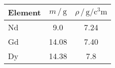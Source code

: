     \begin{table}
        \centering
        \caption{}
        \label{tab:}
        \begin{tabular}{l S[table-format=2.2] S[table-format=1.2]}
            \toprule
            Element & 
            $m\,/\,\si{\gram}$ & 
            $\rho\,/\,\si{\gram\per\cubic\centi\meter}$ \\
            \midrule
            Nd & \num{9.0}   & \num{7.24} \\
            Gd & \num{14.08} & \num{7.40} \\
            Dy & \num{14.38} & \num{7.8}  \\
            \bottomrule
        \end{tabular}
    \end{table}